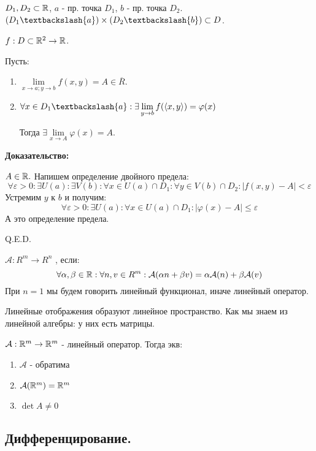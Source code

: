 
$D_1, D_2 \subset \mathbb{R}$, $a$ - пр. точка $D_1$, $b$ - пр. точка $D_2$. $(D_1 \textbackslash \{ a\})\times (D_2 \textbackslash \{ b\}) \subset D$.

$f:D \subset \mathbb{R}^2 \rightarrow \mathbb{R}$. 

Пусть:

\begin{enumerate}
    \item $\lim\limits_{x\rightarrow a; y\rightarrow b}f(x,y) = A \in  \overline{R}$.
    \item $\forall x \in D_1 \textbackslash \{a\}: \exists\lim\limits_{y\rightarrow b} f(\langle x,y \rangle) = \varphi(x)$  
    
    Тогда $\exists \lim\limits_{x\rightarrow A} \varphi(x) = A$.
\end{enumerate}

\textbf{Доказательство:} 

$A \in \mathbb{R}.$ Напишем определение двойного предела:
$$ \forall \varepsilon > 0 : \exists U(a): \exists V(b): \forall x \in U(a) \cap D_1: \forall y \in V(b) \cap D_2 : |f(x,y)-A|<\varepsilon$$
Устремим $y$ к $b$ и получим:
$$ \forall \varepsilon > 0 : \exists U(a): \forall x \in U(a) \cap D_1: |\varphi(x)-A|\leq\varepsilon$$
А это определение предела.

\hfill Q.E.D.

 $\mathcal{A}: R^m \rightarrow R^n$ , если:
$$\forall \alpha,\beta \in \mathbb{R} : \forall n, v \in R^m: \mathcal{A}(\alpha n + \beta v) = \alpha \mathcal{A}(n) + \beta \mathcal{A}(v) $$
При $n=1$ мы будем говорить линейный функционал, иначе линейный оператор.

Линейные отображения образуют линейное пространство. Как мы знаем из линейной алгебры: у них есть матрицы.


$\mathcal{A}: \mathbb{R}^m \rightarrow \mathbb{R}^m$ - линейный оператор. Тогда экв:
\begin{enumerate}
    \item $\mathcal{A}$ - обратима
    \item $\mathcal{A}(\mathbb{R}^m)=\mathbb{R}^m$
    \item $\det A \neq 0$
\end{enumerate}

\pagebreak

\subsection{Дифференцирование.}

